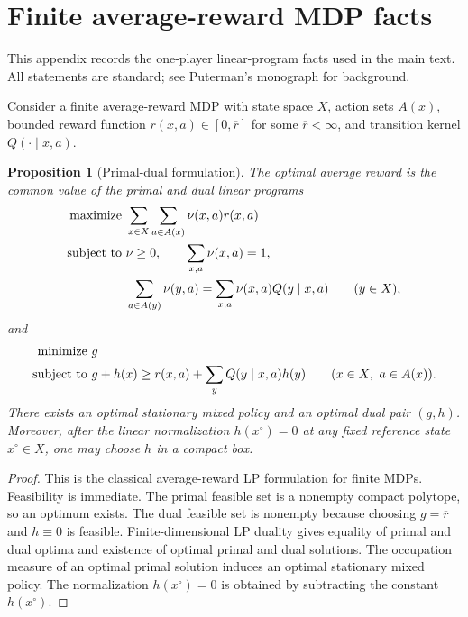 \documentclass[12pt]{article}
\newtheorem{proposition}[theorem]{Proposition}
\theoremstyle{definition}
\newcommand{\1}{\mathbf{1}}
\begin{document}
\appendix

\section{Finite average-reward MDP facts}
\label{app:mdp}

This appendix records the one-player linear-program facts used in the main text.
All statements are standard; see Puterman's monograph \cite{Puterman1994} for
background.

Consider a finite average-reward MDP with state space $X$, action sets $A(x)$,
bounded reward function $r(x,a)\in[0,\overline r]$ for some $\overline r<\infty$,
and transition kernel $Q(\cdot\mid x,a)$.

\begin{proposition}[Primal-dual formulation]
\label{prop:mdp-duality}
The optimal average reward is the common value of the primal and dual linear
programs
\begin{align*}
\textnormal{maximize }&\sum_{x\in X}\sum_{a\in A(x)}\nu(x,a)r(x,a)
\\
\textnormal{subject to }&\nu\ge 0,
\qquad \sum_{x,a}\nu(x,a)=1,
\\
&\sum_{a\in A(y)}\nu(y,a)=\sum_{x,a}\nu(x,a)Q(y\mid x,a)
\qquad (y\in X),
\end{align*}
and
\begin{align*}
\textnormal{minimize }&g
\\
\textnormal{subject to }&g+h(x)\ge r(x,a)+\sum_y Q(y\mid x,a)h(y)
\qquad (x\in X,\ a\in A(x)).
\end{align*}
There exists an optimal stationary mixed policy and an optimal dual pair $(g,h)$.
Moreover, after the linear normalization $h(x^\circ)=0$ at any fixed reference
state $x^\circ\in X$, one may choose $h$ in a compact box.
\end{proposition}

\begin{proof}
This is the classical average-reward LP formulation for finite MDPs. Feasibility is
immediate. The primal feasible set is a nonempty compact polytope, so an optimum
exists. The dual feasible set is nonempty because choosing $g=\overline r$ and
$h\equiv 0$ is feasible. Finite-dimensional LP duality gives equality of primal
and dual
optima and existence of optimal primal and dual solutions. The occupation measure
of an optimal primal solution induces an optimal stationary mixed policy. The
normalization $h(x^\circ)=0$ is obtained by subtracting the constant $h(x^\circ)$.
\end{proof}
\end{document}
